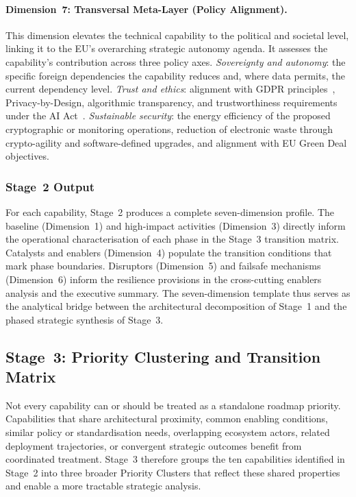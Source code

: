 \paragraph{Dimension~7: Transversal Meta-Layer (Policy Alignment).}
This dimension elevates the technical capability to the political and societal level, linking it to the EU's overarching strategic autonomy agenda. It assesses the capability's contribution across three policy axes. \textit{Sovereignty and autonomy}: the specific foreign dependencies the capability reduces and, where data permits, the current dependency level. \textit{Trust and ethics}: alignment with GDPR principles~\cite{gdpr}, Privacy-by-Design, algorithmic transparency, and trustworthiness requirements under the AI Act~\cite{aiact}. \textit{Sustainable security}: the energy efficiency of the proposed cryptographic or monitoring operations, reduction of electronic waste through crypto-agility and software-defined upgrades, and alignment with EU Green Deal objectives.


\subsubsection{Stage~2 Output}
\label{sec:meth-stage2-output}

For each capability, Stage~2 produces a complete seven-dimension profile. The baseline (Dimension~1) and high-impact activities (Dimension~3) directly inform the operational characterisation of each phase in the Stage~3 transition matrix. Catalysts and enablers (Dimension~4) populate the transition conditions that mark phase boundaries. Disruptors (Dimension~5) and failsafe mechanisms (Dimension~6) inform the resilience provisions in the cross-cutting enablers analysis and the executive summary. The seven-dimension template thus serves as the analytical bridge between the architectural decomposition of Stage~1 and the phased strategic synthesis of Stage~3.


\subsection{Stage~3: Priority Clustering and Transition Matrix}
\label{sec:meth-stage3}

Not every capability can or should be treated as a standalone roadmap priority. Capabilities that share architectural proximity, common enabling conditions, similar policy or standardisation needs, overlapping ecosystem actors, related deployment trajectories, or convergent strategic outcomes benefit from coordinated treatment. Stage~3 therefore groups the ten capabilities identified in Stage~2 into three broader Priority Clusters that reflect these shared properties and enable a more tractable strategic analysis.

